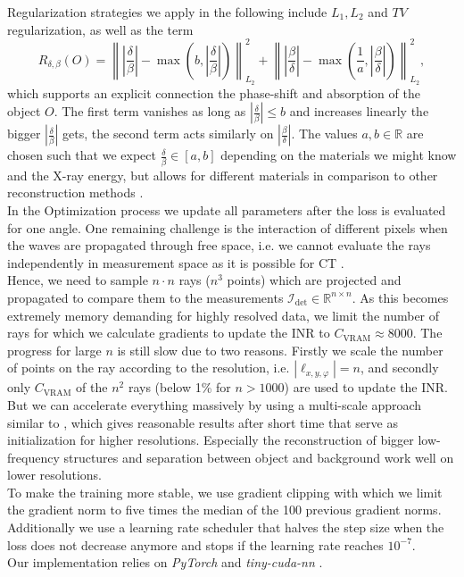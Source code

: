 Regularization strategies we apply in the following include \( L_{1}, L_{2} \) and \(  TV \) regularization, as well as the term
\begin{equation}
R_{\delta,\beta} (O) = \left\| \left| \frac{\delta}{\beta} \right| - \max \left(  b, \left| \frac{\delta}{\beta} \right| \right)  \right\|_{L_2}^2 +  \left\| \left| \frac{\beta}{\delta} \right| - \max \left(   \frac{1}{a}, \left| \frac{\beta}{\delta} \right| \right) \right\|_{L_2}^2, 
  \label{eq:d/b_regularization}
\end{equation}
which supports an explicit connection the phase-shift and absorption of the object \(  O  \).
The first term vanishes as long as \( \left| \frac{\delta}{\beta} \right| \le b \) and increases linearly the bigger \( \left| \frac{\delta}{\beta} \right| \) gets, the second term acts similarly on \( \left| \frac{\beta}{\delta} \right| \).
The values \( a, b \in \mathbb{R} \) are chosen such that we expect \( \frac{\delta}{\beta} \in \left[ a,b \right]  \) depending on the materials we might know and the X-ray energy, but allows for different materials in comparison to other reconstruction methods \cite{villanueva-perezContrasttransferfunctionPhaseRetrieval2017}.
\\
In the Optimization process we update all parameters after the loss is evaluated for one angle.
One remaining challenge is the interaction of different pixels when the waves are propagated through free space, i.e.
we cannot evaluate the rays independently in measurement space as it is possible for CT \cite{zhaNAFNeuralAttenuation2022}.\\
Hence, we need to sample \( n \cdot  n \) rays (\(  n^3 \) points) which are projected and propagated to compare them to the measurements \( \mathcal{I}_\mathrm{det} \in \mathbb{R}^{n \times n} \).
As this becomes extremely memory demanding for highly resolved data, we limit the number of rays for which we calculate gradients to update the INR to \( C_\mathrm{VRAM} \approx 8000 \).
The progress for large \(  n \) is still slow due to two reasons.
Firstly we scale the number of points on the ray according to the resolution, i.e. \( \left| \ell_{x,y,\varphi} \right| = n  \), and secondly only \( C_\mathrm{VRAM} \) of the \(  n^2 \) rays (below 1\% for \( n>1000 \)) are used to update the INR.
But we can accelerate everything massively by using a multi-scale approach similar to \cite{doraArtifactsuppressingReconstructionStrongly2024,nikitinScalableJointXray2026}, which gives reasonable results after short time that serve as initialization for higher resolutions.
Especially the reconstruction of bigger low-frequency structures and separation between object and background work well on lower resolutions.\\
To make the training more stable, we use gradient clipping with which we limit the gradient norm to five times the median of the 100 previous gradient norms. Additionally we use a learning rate scheduler that halves the step size when the loss does not decrease anymore and stops if the learning rate reaches \( 10^{-7} \).
\\
Our implementation relies on \textit{PyTorch} and \textit{tiny-cuda-nn} \cite{paszkePyTorchImperativeStyle2019, tiny-cuda-nn}.

